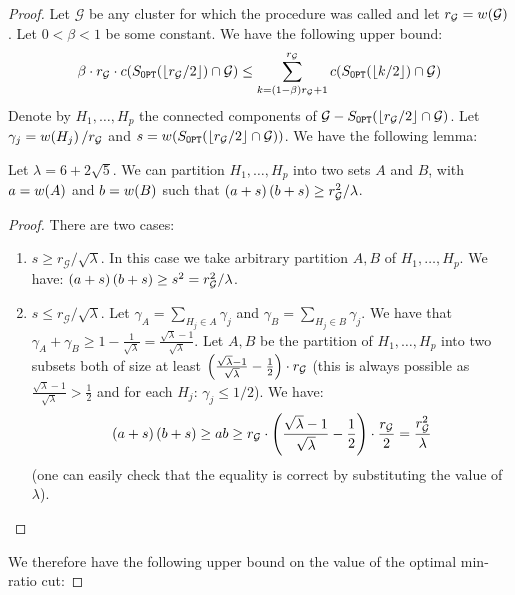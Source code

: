 \begin{theorem}
\begin{proof}
        Let $\mathcal{G}$ be any cluster for which the procedure was called and let $r_{\mathcal{G}}=w\mathopen{}\left( \mathcal{G} \right)$. Let $0<\beta<1$ be some constant. We have the following upper bound:
            $$
           \beta\cdot r_{\mathcal{G}}\cdot c\mathopen{}\left( S_{\texttt{OPT}}\mathopen{}\left( \mathopen{}\left\lfloor r_{\mathcal{G}}/2 \right\rfloor \right)\cap \mathcal{G} \right)
            \leq \sum_{k=\mathopen{}\left( 1-\beta \right)r_{\mathcal{G}}+1}^{r_{\mathcal{G}}}c\mathopen{}\left( S_{\texttt{OPT}}\mathopen{}\left( \mathopen{}\left\lfloor k/2 \right\rfloor \right)\cap \mathcal{G} \right)
            $$
        Denote by $H_1,\dots,H_p$ the connected components of $\mathcal{G}-S_{\texttt{OPT}}\mathopen{}\left( \mathopen{}\left\lfloor r_{\mathcal{G}}/2 \right\rfloor\cap \mathcal{G} \right)$. Let $\gamma_j=w\mathopen{}\left( H_j \right)/r_{\mathcal{G}}$ and $s=w\mathopen{}\left( S_{\texttt{OPT}}\mathopen{}\left( \mathopen{}\left\lfloor r_{\mathcal{G}}/2 \right\rfloor\cap \mathcal{G} \right) \right)$. We have the following lemma:
        \begin{lemma}
            Let $\lambda=6+2\sqrt{5}$. We can partition $H_1,\dots,H_p$ into two sets $A$ and $B$, with $a=w\mathopen{}\left( A \right)$ and $b=w\mathopen{}\left( B \right)$ such that $\mathopen{}\left( a+s \right)\mathopen{}\left( b+s \right)\geq r_{\mathcal{G}}^2/\lambda$.
            \begin{proof}
                There are two cases:
                \begin{enumerate}
                    \item $s\geq r_{\mathcal{G}}/\sqrt{\lambda}$. In this case we take arbitrary partition $A, B$ of $H_1,\dots,H_p$. We have:
                    $\mathopen{}\left( a+s \right)\mathopen{}\left( b+s \right)\geq s^2 = r_{\mathcal{G}}^2/\lambda $.
                    \item $s \leq r_{\mathcal{G}}/\sqrt{\lambda}$.
                Let $\gamma_A = \sum_{H_j\in A}\gamma_j$ and $\gamma_B = \sum_{H_j\in B}\gamma_j$. We have that $\gamma_A+\gamma_B\geq 1-\frac{1}{\sqrt{\lambda}}=\frac{\sqrt{\lambda}-1}{\sqrt{\lambda}}$. Let $A,B$ be the partition of $H_1,\dots,H_p$ into two subsets both of size at least $\mathopen{}\left( \frac{\sqrt{\lambda}-1}{\sqrt{\lambda}}-\frac{1}{2} \right)\cdot r_{\mathcal{G}}$ (this is always possible as $\frac{\sqrt{\lambda}-1}{\sqrt{\lambda}} > \frac{1}{2}$ and for each $H_j$: $\gamma_j\leq 1/2$). We have:
                $$
                \mathopen{}\left( a+s \right)\mathopen{}\left( b+s \right)\geq ab \geq r_{\mathcal{G}}\cdot \mathopen{}\left( \frac{\sqrt{\lambda}-1}{\sqrt{\lambda}}-\frac{1}{2} \right)\cdot\frac{r_{\mathcal{G}}}{2} = \frac{r_{\mathcal{G}}^2}{\lambda}
                $$
                (one can easily check that the equality is correct by substituting the value of $\lambda$). 
                \end{enumerate}
            \end{proof}
        \end{lemma}
        We therefore have the following upper bound on the value of the optimal min-ratio cut:

\end{proof}
\end{theorem}
